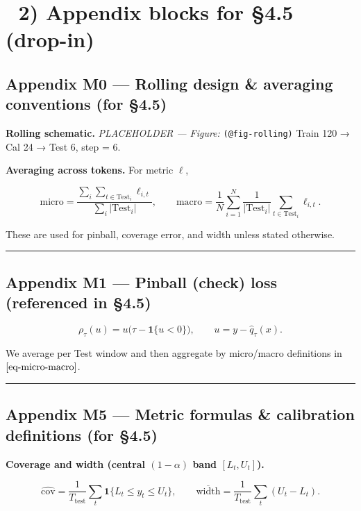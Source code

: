 \documentclass[
  a4paper,
  DIV=11,
  numbers=noendperiod]{scrreprt}
\begin{document}
\section{📎 2) Appendix blocks for §4.5
(drop-in)}\label{appendix-blocks-for-4.5-drop-in}

\subsection{Appendix M0 --- Rolling design \& averaging conventions (for
§4.5)}\label{app-m0-notation}

\textbf{Rolling schematic.} \emph{PLACEHOLDER --- Figure:}
\texttt{(@fig-rolling)} Train 120 → Cal 24 → Test 6, step = 6.

\textbf{Averaging across tokens.} For metric \(\ell\),

\[
\label{eq-micro-macro}
\text{micro}=\frac{\sum_{i}\sum_{t\in \text{Test}_i}\ell_{i,t}}{\sum_{i}|\text{Test}_i|},\qquad
\text{macro}=\frac{1}{N}\sum_{i=1}^{N}\frac{1}{|\text{Test}_i|}\sum_{t\in \text{Test}_i}\ell_{i,t}.
\]

These are used for pinball, coverage error, and width unless stated
otherwise.

\begin{center}\rule{0.5\linewidth}{0.5pt}\end{center}

\subsection{Appendix M1 --- Pinball (check) loss (referenced in
§4.5)}\label{app-m1-pinball}

\[
\label{eq-pinball}
\rho_\tau(u)=u\big(\tau-\mathbf{1}\{u<0\}\big),\qquad u=y-\widehat q_\tau(x).
\]

We average per Test window and then aggregate by micro/macro definitions
in \(\eqref{eq-micro-macro}\).

\begin{center}\rule{0.5\linewidth}{0.5pt}\end{center}

\subsection{Appendix M5 --- Metric formulas \& calibration definitions
(for §4.5)}\label{app-m5-metrics}

\textbf{Coverage and width (central \((1-\alpha)\) band \([L_t,U_t]\)).}

\[
\label{eq-coverage-width}
\widehat{\mathrm{cov}}=\frac{1}{T_{\text{test}}}\sum_t \mathbf{1}\{L_t\le y_t\le U_t\},\qquad
\overline{\mathrm{width}}=\frac{1}{T_{\text{test}}}\sum_t (U_t-L_t).
\]
\end{document}
